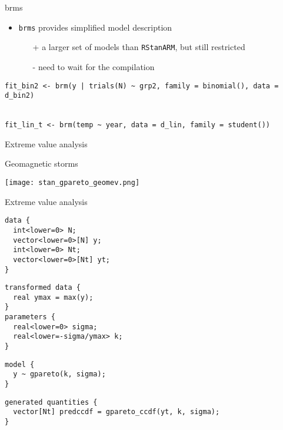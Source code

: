 \documentclass[finnish,english,t]{beamer}
\begin{document}
\begin{frame}[fragile]{brms}

  \begin{itemize}
  \item \texttt{brms} provides simplified model description
    \begin{itemize}
    \item[+] a larger set of models than \texttt{RStanARM}, but still restricted
    \item[-] need to wait for the compilation
    \end{itemize}
  \end{itemize}

  {\footnotesize
\begin{verbatim}
fit_bin2 <- brm(y | trials(N) ~ grp2, family = binomial(), data = d_bin2)


fit_lin_t <- brm(temp ~ year, data = d_lin, family = student())
\end{verbatim}
  }
    
\end{frame} 

\begin{frame}{Extreme value analysis}

Geomagnetic storms

\texttt{[image: stan\_gpareto\_geomev.png]}  

\end{frame}

\begin{frame}[fragile]{Extreme value analysis}
  
  {\footnotesize
    {
  \begin{verbatim}
data {
  int<lower=0> N;
  vector<lower=0>[N] y;
  int<lower=0> Nt;
  vector<lower=0>[Nt] yt;
}
\end{verbatim}
    }
    \vspace{-1.5\baselineskip}
    {
\begin{verbatim}
transformed data {
  real ymax = max(y);
}
parameters {
  real<lower=0> sigma; 
  real<lower=-sigma/ymax> k; 
}
\end{verbatim}
    }
    \vspace{-1.5\baselineskip}
    {
\begin{verbatim}
model {
  y ~ gpareto(k, sigma);
}
\end{verbatim}
    }
    \vspace{-1.5\baselineskip}
    {
\begin{verbatim}
generated quantities {
  vector[Nt] predccdf = gpareto_ccdf(yt, k, sigma);
}
  \end{verbatim}
  }
}  
\end{frame} 
\end{document}
